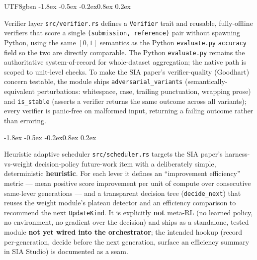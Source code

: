 \documentclass{article}
\makeatletter
\renewcommand{\subsection}{\@startsection{subsection}{2}{\z@}%
  {-1.8ex \@plus -0.5ex \@minus -0.2ex}{0.8ex \@plus 0.2ex}%
  {\normalsize\bfseries\raggedright\color{accent}}}
\makeatother
\begin{document}
\begin{CJK}{UTF8}{gbsn}
\subsection{Verifier layer}
\texttt{src/verifier.rs} defines a \texttt{Verifier} trait and reusable,
fully-offline verifiers that score a single \texttt{(submission, reference)} pair
without spawning Python, using the same $[0,1]$ semantics as the Python
\texttt{evaluate.py} \texttt{accuracy} field so the two are directly comparable. The
Python \texttt{evaluate.py} remains the authoritative system-of-record for
whole-dataset aggregation; the native path is scoped to unit-level checks. To make
the SIA paper's verifier-quality (Goodhart) concern testable, the module ships
\texttt{adversarial\_variants} (semantically-equivalent perturbations: whitespace,
case, trailing punctuation, wrapping prose) and \texttt{is\_stable} (asserts a
verifier returns the same outcome across all variants); every verifier is panic-free
on malformed input, returning a failing outcome rather than erroring.

\subsection{Heuristic adaptive scheduler}
\texttt{src/scheduler.rs} targets the SIA paper's harness-vs-weight decision-policy
future-work item with a deliberately simple, deterministic \textbf{heuristic}. For
each lever it defines an ``improvement efficiency'' metric --- mean positive score
improvement per unit of compute over consecutive same-lever generations --- and a
transparent decision tree (\texttt{decide\_next}) that reuses the weight module's
plateau detector and an efficiency comparison to recommend the next
\texttt{UpdateKind}. It is explicitly \textbf{not} meta-RL (no learned policy, no
environment, no gradient over the decision) and ships as a standalone, tested module
\textbf{not yet wired into the orchestrator}; the intended hookup (record
per-generation, decide before the next generation, surface an efficiency summary in
SIA Studio) is documented as a seam.


\end{CJK}
\end{document}
